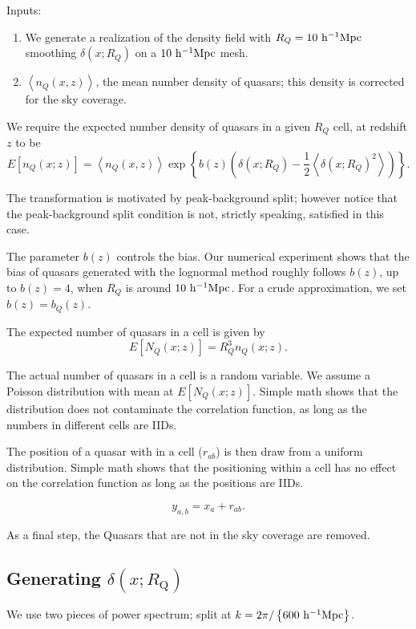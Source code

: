 \documentclass{paper}
\begin{document}
    Inputs:
    \begin{enumerate}
        \item 
            We generate a realization of the density field 
        with $R_Q = 10\,\mpch$ smoothing $\delta(x; R_Q)$ on
        a $10\,\mpch$ mesh. 
        \item $\left<n_Q(x, z)\right>$, 
            the mean number density of quasars; this density is
            corrected for the sky coverage.
    \end{enumerate}

    We require the expected number density of quasars in a given $R_Q$
    cell, at redshift $z$ to be
    \[
        E[n_Q(x; z)] = \left<n_Q(x, z)\right> 
        \exp \left\{b(z) \left( 
        \delta(x; R_Q) - \frac{1}{2}\left<\delta(x;
        R_Q)^2\right>
    \right)\right\}.
    \]

    The transformation is
    motivated by peak-background split; however notice that
    the peak-background split condition is not, strictly
    speaking, satisfied in this case.

    The parameter $b(z)$ controls the bias. Our numerical
    experiment shows that the bias of quasars generated with
    the lognormal method roughly follows $b(z)$, up to
    $b(z)=4$, when $R_Q$ is around $10\,\mpch$. For a crude
    approximation, we set $b(z) = b_Q(z)$.

    The expected number of quasars in a cell is given by 
    \[
        E[N_Q(x; z)] = R_Q^3 n_Q(x; z).
    \]

    The actual number of quasars in a cell is a random
    variable. We assume a Poisson distribution with mean at
    $E[N_Q(x; z)]$. Simple math shows that the distribution 
    does not contaminate the correlation function, as long
    as the numbers in different cells are IIDs.

    The position of a quasar with in a cell ($r_{ab}$) is then draw from a
    uniform distribution. Simple math shows that the
    positioning within a cell has no effect on the
    correlation function as long as the positions are IIDs.

    \[
        y_{a, b} = x_a + r_{ab}.
    \]

    As a final step, the Quasars that are not in the sky coverage are
    removed.

\subsection{Generating $\delta(x; R_\mathrm{Q})$}
    We use two pieces of power spectrum; 
    split at $k = 2\pi / \left\{600\, \mpch \right\}$.
\end{document}
